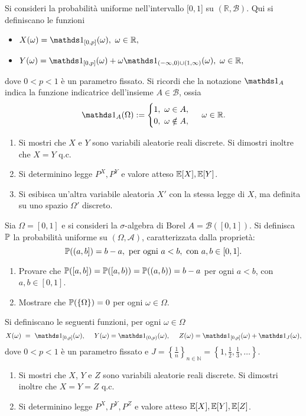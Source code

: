 Si consideri la probabilità uniforme nell'intervallo $[ 0,1$] su $(\mathbb{R} ,\mathcal{B})$. Qui si definiscano le funzioni
\begin{itemize}
\item $X( \omega ) =\Ind_{[ 0,p]}( \omega ) ,\ \omega \in \mathbb{R} ,$
\item $Y( \omega ) =\Ind_{[ 0,p]}( \omega ) +\omega \Ind_{( -\infty ,0) \cup ( 1,\infty )}( \omega ) ,\ \omega \in \mathbb{R} ,$
\end{itemize}

dove $0< p< 1$ è un parametro fissato. Si ricordi che la notazione $\Ind_{A}$ indica la funzione indicatrice dell'insieme $A\in \mathcal{B}$, ossia
\begin{equation*}
\Ind_{A}( \Omega ) :=\begin{cases}
1,\ \omega \in A,\\
0,\ \omega \notin A,
\end{cases} \ \omega \in \mathbb{R} .
\end{equation*}
\begin{enumerate}
\item Si mostri che $X$ e $Y$ sono variabili aleatorie reali discrete. Si dimostri inoltre che $X=Y$ q.c.
\item Si determinino legge $P^{X} ,P^{Y}$ e valore atteso $\mathbb{E}[ X] ,\mathbb{E}[ Y]$.
\item Si esibisca un'altra variabile aleatoria $X' $ con la stessa legge di $X$, ma definita su uno spazio $\Omega ' $ discreto.
\end{enumerate}
\Esercizio{}

Sia $\Omega =[ 0,1]$ e si consideri la $\sigma $-algebra di Borel $A=\mathcal{B}([ 0,1])$. Si definisca $\mathbb{P}$ la probabilità uniforme su $( \Omega ,\mathcal{A})$, caratterizzata dalla proprietà:
\begin{equation*}
\mathbb{P}(( a,b]) =b-a,\ \text{per ogni} \ a< b,\ \text{con} \ a,b\in [ 0,1] .
\end{equation*}
\begin{enumerate}
\item Provare che $\mathbb{P}([ a,b]) =\mathbb{P}([ a,b)) =\mathbb{P}(( a,b)) =b-a$ per ogni $a< b$, con $a,b\in [ 0,1]$.
\item Mostrare che $\mathbb{P}(\{\Omega \}) =0$ per ogni $\omega \in \Omega $.
\end{enumerate}

Si definiscano le seguenti funzioni, per ogni $\omega \in \Omega $
\begin{equation*}
X( \omega ) \ =\ \Ind_{[ 0,p]}( \omega ) ,\ \ \ \ Y( \omega ) =\Ind_{( 0,p)}( \omega ) ,\ \ \ \ Z( \omega ) =\Ind_{[ 0,p]}( \omega ) +\Ind_{J}( \omega ) ,
\end{equation*}
dove $0< p< 1$ è un parametro fissato e $J=\left\{\frac{1}{n}\right\}_{n\in \mathbb{N}} =\left\{1,\frac{1}{2} ,\frac{1}{3} ,\dots \right\}$.
\begin{enumerate}
\item Si mostri che $X$, $Y$ e $Z$ sono variabili aleatorie reali discrete. Si dimostri inoltre che $X=Y=Z$ q.c.
\item Si determinino legge $P^{X} ,P^{Y} ,P^{Z}$ e valore atteso $\mathbb{E}[ X] ,\mathbb{E}[ Y] ,\mathbb{E}[ Z]$.
\end{enumerate}
\Esercizio{}

